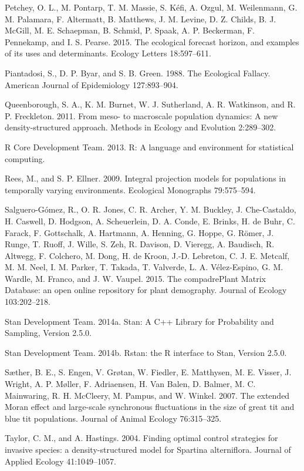 \documentclass[12pt,]{article}
\begin{document}
Petchey, O. L., M. Pontarp, T. M. Massie, S. Kéfi, A. Ozgul, M.
Weilenmann, G. M. Palamara, F. Altermatt, B. Matthews, J. M. Levine, D.
Z. Childs, B. J. McGill, M. E. Schaepman, B. Schmid, P. Spaak, A. P.
Beckerman, F. Pennekamp, and I. S. Pearse. 2015. The ecological forecast
horizon, and examples of its uses and determinants. Ecology Letters
18:597--611.

Piantadosi, S., D. P. Byar, and S. B. Green. 1988. The Ecological
Fallacy. American Journal of Epidemiology 127:893--904.

Queenborough, S. A., K. M. Burnet, W. J. Sutherland, A. R. Watkinson,
and R. P. Freckleton. 2011. From meso- to macroscale population
dynamics: A new density-structured approach. Methods in Ecology and
Evolution 2:289--302.

R Core Development Team. 2013. R: A language and environment for
statistical computing.

Rees, M., and S. P. Ellner. 2009. Integral projection models for
populations in temporally varying environments. Ecological Monographs
79:575--594.

Salguero-Gómez, R., O. R. Jones, C. R. Archer, Y. M. Buckley, J.
Che-Castaldo, H. Caswell, D. Hodgson, A. Scheuerlein, D. A. Conde, E.
Brinks, H. de Buhr, C. Farack, F. Gottschalk, A. Hartmann, A. Henning,
G. Hoppe, G. Römer, J. Runge, T. Ruoff, J. Wille, S. Zeh, R. Davison, D.
Vieregg, A. Baudisch, R. Altwegg, F. Colchero, M. Dong, H. de Kroon,
J.-D. Lebreton, C. J. E. Metcalf, M. M. Neel, I. M. Parker, T. Takada,
T. Valverde, L. A. Vélez-Espino, G. M. Wardle, M. Franco, and J. W.
Vaupel. 2015. The compadrePlant Matrix Database: an open online
repository for plant demography. Journal of Ecology 103:202--218.

Stan Development Team. 2014a. Stan: A C++ Library for Probability and
Sampling, Version 2.5.0.

Stan Development Team. 2014b. Rstan: the R interface to Stan, Version
2.5.0.

Sæther, B. E., S. Engen, V. Grøtan, W. Fiedler, E. Matthysen, M. E.
Visser, J. Wright, A. P. Møller, F. Adriaensen, H. {Van Balen}, D.
Balmer, M. C. Mainwaring, R. H. McCleery, M. Pampus, and W. Winkel.
2007. The extended Moran effect and large-scale synchronous fluctuations
in the size of great tit and blue tit populations. Journal of Animal
Ecology 76:315--325.

Taylor, C. M., and A. Hastings. 2004. Finding optimal control strategies
for invasive species: a density-structured model for Spartina
alterniflora. Journal of Applied Ecology 41:1049--1057.
\end{document}
